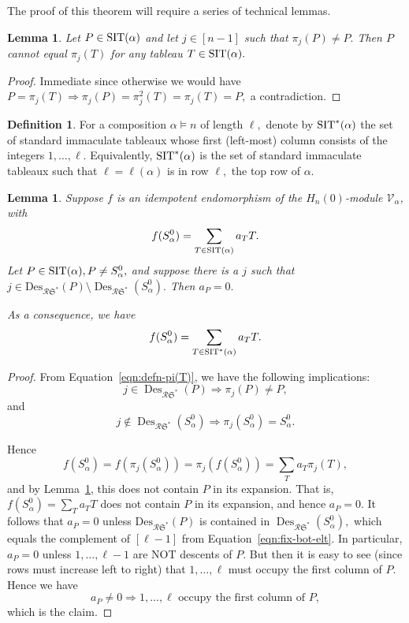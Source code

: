 \documentclass[12pt,letterpaper]{amsart}
\newtheorem{lemma}[theorem]{Lemma}
\theoremstyle{definition}
\newtheorem{definition}[theorem]{Definition}
\newcommand{\rdI}{\mathcal{R}\mathfrak{S}^*}
\DeclareMathOperator{\Des}{Des}
\newcommand{\hn}{H_n(0)}
\begin{document}
The proof of this theorem will require a series of technical lemmas.

\begin{lemma}\label{lem:indecomplemma0}\cite[Proof of Theorem 3.12]{BBSSZ2015} Let $P\in \operatorname{SIT}(\alpha)$ and let $j\in [n-1]$ such that $\pi_j(P)\ne P.$ Then $P$ cannot equal $\pi_j(T)$ for any tableau $T\in \operatorname{SIT}(\alpha).$
\end{lemma}

\begin{proof} Immediate since otherwise we would have $P=\pi_j(T)\Rightarrow \pi_j(P)=\pi_j^2(T)=\pi_j(T)=P,$ 
a contradiction.
\end{proof}


\begin{definition}\label{def:SIT-1st-col} For a composition $\alpha\vDash n$ of length $\ell,$ denote by $\operatorname{SIT}^*(\alpha)$ the set of standard immaculate tableaux whose first (left-most) column consists of the integers 
$1,\ldots,\ell.$ Equivalently, $\operatorname{SIT}^*(\alpha)$ is the set of standard immaculate tableaux such that $\ell=\ell(\alpha)$ is in row $\ell,$ the top row of $\alpha.$
\end{definition}

\begin{lemma}\label{lem:indecomplemma1} Suppose $f$ is an idempotent  endomorphism of the $\hn$-module $\mathcal{V}_\alpha$, with 
\[f(S^0_\alpha)=\sum_{T\in \operatorname{SIT}(\alpha)} a_T T. \] 
Let $P\in \operatorname{SIT}(\alpha), P\ne S^0_\alpha,$ and 
suppose there is a $j$ such that $j\in \mathrm{Des}_{\rdI}(P)\setminus\Des_{\rdI}(S^0_\alpha).$
Then $a_P=0.$ 

As a consequence,  we have 
\[f(S^0_\alpha)=\sum_{T\in \operatorname{SIT}^*(\alpha)} a_T T.\]
\end{lemma}

\begin{proof} From Equation~\eqref{eqn:defn-pi(T)}, we have the following implications:
\[j\in \Des_{\rdI}(P) \Rightarrow \pi_j(P)\ne P,\] 
 and 
\[  j\notin \Des_{\rdI}(S^0_\alpha) \Rightarrow \pi_j(S^0_\alpha)=S^0_\alpha.   \]

Hence
\[f(S^0_\alpha)=f(\pi_j(S^0_\alpha))=\pi_j(f(S^0_\alpha))=\sum_T a_T \pi_j(T),\]
and by Lemma~\ref{lem:indecomplemma0}, this does not contain $P$ in its expansion. 
That is, 
$f(S^0_\alpha)=\sum_T a_T T$ does not contain $P$ in its expansion, and hence $a_P=0.$
It follows that $a_P=0$ unless $\mathrm{Des}_{\rdI}(P)$ is contained in $\Des_{\rdI}(S^0_\alpha),$ which equals the complement of $[\ell-1]$ from Equation~\eqref{eqn:fix-bot-elt}. In particular, $a_P=0$ unless $1, \ldots , \ell-1$ are NOT descents of $P.$ But then it is easy to see (since rows must increase left to right) that $1, \ldots , \ell$ must occupy the first column of $P.$  Hence we have 
\[a_P\ne 0 \Rightarrow 1, \ldots , \ell \text{ occupy the first column of } P,\]
which is the claim. 
\end{proof}
\end{document}
